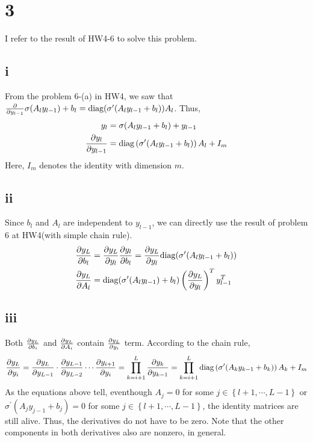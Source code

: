 \documentclass[10pt]{article}
\begin{document}
\section*{3}
I refer to the result of HW4-6 to solve this problem. 
\subsection*{i}
From the problem 6-(a) in HW4, we saw that ${\partial\over \partial y_{l-1}} \sigma(A_ly_{l-1}) + b_l = \text{diag}(\sigma^\prime(A_ly_{l-1} + b_l))A_l$. Thus,
\begin{align*}
    y_l &= \sigma(A_ly_{l-1} + b_l) + y_{l-1} \\
    {\partial y_l \over \partial y_{l-1}} &= \text{diag}\left(\sigma^\prime(A_ly_{l-1} + b_l)\right)A_l + I_m
\end{align*}
Here, $I_m$ denotes the identity with dimension $m$.
\subsection*{ii}
Since $b_l$ and $A_l$ are independent to $y_{l-1}$, we can directly use the result of problem 6 at HW4(with simple chain rule).
\begin{align*}
    {\partial y_L\over \partial b_l} &= {\partial y_L \over \partial y_l} {\partial y_l \over \partial b_l} = {\partial y_L \over \partial y_l} \text{diag}(\sigma^\prime(A_ly_{l-1} + b_l))\\
    {\partial y_L \over \partial A_l} &= \text{diag}(\sigma^\prime(A_ly_{l-1})+ b_l)\left({\partial y_L \over \partial y_l}\right)^T y_{l-1}^T
\end{align*}

\subsection*{iii}
Both ${\partial y_L\over \partial b_i}$ and ${\partial y_L \over \partial A_i}$ contain ${\partial y_L \over \partial y_i}$ term. According to the chain rule, 
\begin{align*}
    {\partial y_L\over \partial y_i} = {\partial y_L \over \partial y_{L-1}} \cdot {\partial y_{L-1} \over \partial y_{L-2}}\cdots {\partial y_{i+1} \over \partial y_{i}} = \prod_{k = i+1}^L {\partial y_k \over \partial y_{k-1}} = \prod_{k = i+1}^L \text{diag}\left( \sigma^\prime(A_ky_{k-1} + b_k) \right)A_k + I_m
\end{align*}
As the equations above tell, eventhough $A_j = 0 $ for some $j\in \left\{l+1, \cdots, L-1\right\}$ or $\sigma^\prime(A_jy_{j-1} + b_j) = 0$ for some $j \in \left\{l+1,\cdots, L-1\right\}$, the identity matrices are still alive. Thus, the derivatives do not have to be zero.
Note that the other components in both derivatives also are nonzero, in general.
\end{document}
